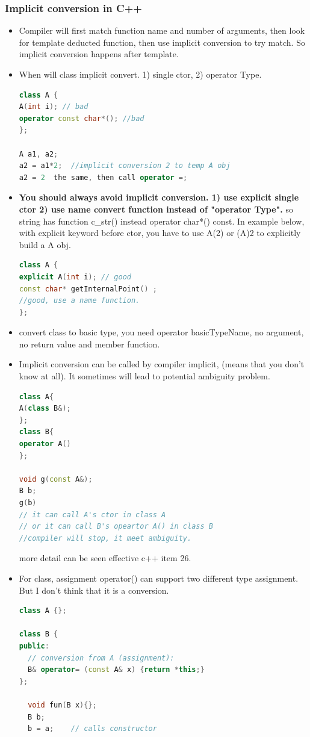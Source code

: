 \documentclass[a4paper,12pt,twoside]{book}
\begin{document}
\subsubsection{Implicit conversion in C++}
\begin{itemize}
\item Compiler will first match function name and number of arguments, then look for template deducted function, then use implicit conversion to try match. So implicit conversion happens after template.

\item When will class implicit convert. 1) single ctor, 2) operator Type.
\begin{lstlisting}[frame=single, language=c++]
class A {
A(int i); // bad
operator const char*(); //bad
};

A a1, a2;
a2 = a1*2;  //implicit conversion 2 to temp A obj
a2 = 2  the same, then call operator =;
\end{lstlisting}

\item \textbf{You should always avoid implicit conversion. 1) use explicit single ctor 2) use name convert function instead of  "operator Type".} so string has function c\_str() instead operator char*() const. In example below, with explicit keyword before ctor,  you have to use A(2) or (A)2 to explicitly build a A obj.
\begin{lstlisting}[frame=single, language=c++]
class A {
explicit A(int i); // good
const char* getInternalPoint() ;
//good, use a name function.
};
\end{lstlisting}

\item  convert class to basic type, you need operator basicTypeName, no argument, no return value and member function.

\item Implicit conversion can be called by compiler implicit, (means that you don't know at all). It sometimes will lead to potential ambiguity problem.
\begin{lstlisting}[frame=single, language=c++]
class A{
A(class B&);
};
class B{
operator A()
};

void g(const A&);
B b;
g(b)
// it can call A's ctor in class A
// or it can call B's opeartor A() in class B
//compiler will stop, it meet ambiguity.
\end{lstlisting}
more detail can be seen effective c++ item 26.

\item For class, assignment operator() can support two different type assignment. But I don't think that it is a conversion.
\begin{lstlisting}[frame=single, language=c++]
class A {};

class B {
public:
  // conversion from A (assignment):
  B& operator= (const A& x) {return *this;}
};

  void fun(B x){};
  B b;
  b = a;    // calls constructor
\end{lstlisting}

\end{itemize}
\end{document}
